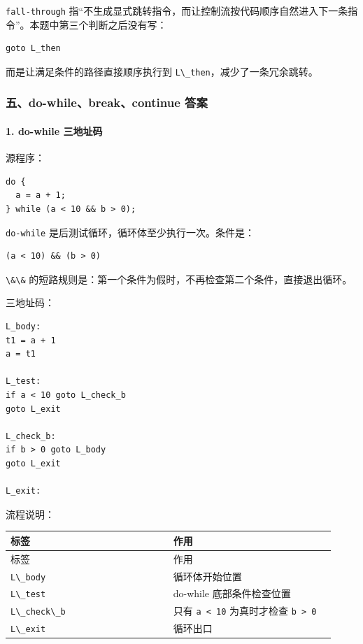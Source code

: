\documentclass[UTF8]{ctexart}
\begin{document}
\texttt{fall-through} 指“不生成显式跳转指令，而让控制流按代码顺序自然进入下一条指令”。本题中第三个判断之后没有写：

\begin{Verbatim}[fontsize=\small,breaklines=true]
goto L_then
\end{Verbatim}

而是让满足条件的路径直接顺序执行到 \texttt{L\textbackslash{}\_then}，减少了一条冗余跳转。

\subsubsection*{五、do-while、break、continue 答案}

\paragraph*{1. do-while 三地址码}

源程序：

\begin{Verbatim}[fontsize=\small,breaklines=true]
do {
  a = a + 1;
} while (a < 10 && b > 0);
\end{Verbatim}

\texttt{do-while} 是后测试循环，循环体至少执行一次。条件是：

\begin{Verbatim}[fontsize=\small,breaklines=true]
(a < 10) && (b > 0)
\end{Verbatim}

\texttt{\textbackslash{}\&\textbackslash{}\&} 的短路规则是：第一个条件为假时，不再检查第二个条件，直接退出循环。

三地址码：

\begin{Verbatim}[fontsize=\small,breaklines=true]
L_body:
t1 = a + 1
a = t1

L_test:
if a < 10 goto L_check_b
goto L_exit

L_check_b:
if b > 0 goto L_body
goto L_exit

L_exit:
\end{Verbatim}

流程说明：

\begin{longtable}{|p{0.47\linewidth}|p{0.47\linewidth}|}
\hline
标签 & 作用 \\
\hline
\endfirsthead
标签 & 作用 \\
\hline
\endhead
\texttt{L\textbackslash{}\_body} & 循环体开始位置 \\
\hline
\texttt{L\textbackslash{}\_test} & do-while 底部条件检查位置 \\
\hline
\texttt{L\textbackslash{}\_check\textbackslash{}\_b} & 只有 \texttt{a < 10} 为真时才检查 \texttt{b > 0} \\
\hline
\texttt{L\textbackslash{}\_exit} & 循环出口 \\
\hline
\end{longtable}
\end{document}
